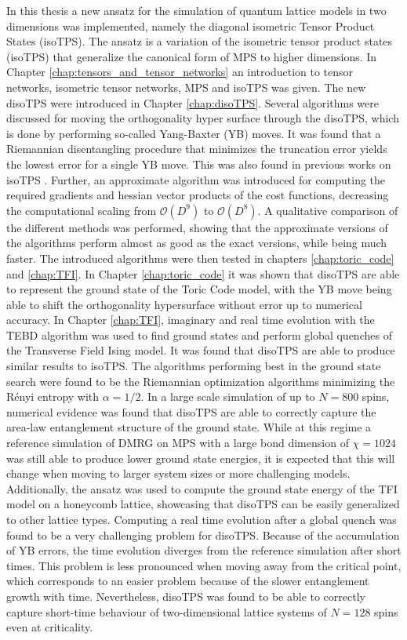 In this thesis a new ansatz for the simulation of quantum lattice models in two dimensions was implemented, namely the diagonal isometric Tensor Product States (isoTPS). The ansatz is a variation of the isometric tensor product states (isoTPS) that generalize the canonical form of MPS to higher dimensions. In Chapter \ref{chap:tensors_and_tensor_networks} an introduction to tensor networks, isometric tensor networks, MPS and isoTPS was given. The new disoTPS were introduced in Chapter \ref{chap:disoTPS}. Several algorithms were discussed for moving the orthogonality hyper	surface through the disoTPS, which is done by performing so-called Yang-Baxter (YB) moves. It was found that a Riemannian disentangling procedure that minimizes the truncation error yields the lowest error for a single YB move. This was also found in previous works on isoTPS \cite{cite:isometric_tensor_network_states_in_two_dimensions, cite:efficient_simulation_of_dynamics_in_two_dimensional_quantum_spin_systems}. Further, an approximate algorithm was introduced for computing the required gradients and hessian vector products of the cost functions, decreasing the computational scaling from $\mathcal{O}(D^9)$ to $\mathcal{O}(D^8)$. A qualitative comparison of the different methods was performed, showing that the approximate versions of the algorithms perform almost as good as the exact versions, while being much faster. The introduced algorithms were then tested in chapters \ref{chap:toric_code} and \ref{chap:TFI}. In Chapter \ref{chap:toric_code} it was shown that disoTPS are able to represent the ground state of the Toric Code model, with the YB move being able to shift the orthogonality hypersurface without error up to numerical accuracy. In Chapter \ref{chap:TFI}, imaginary and real time evolution with the TEBD algorithm was used to find ground states and perform global quenches of the Transverse Field Ising model. It was found that disoTPS are able to produce similar results to isoTPS. The algorithms performing best in the ground state search were found to be the Riemannian optimization algorithms minimizing the Rényi entropy with $\alpha = 1/2$. In a large scale simulation of up to $N = 800$ spins, numerical evidence was found that disoTPS are able to correctly capture the area-law entanglement structure of the ground state. While at this regime a reference simulation of DMRG on MPS with a large bond dimension of $\chi = 1024$ was still able to produce lower ground state energies, it is expected that this will change when moving to larger system sizes or more challenging models. Additionally, the ansatz was used to compute the ground state energy of the TFI model on a honeycomb lattice, showcasing that disoTPS can be easily generalized to other lattice types. Computing a real time evolution after a global quench was found to be a very challenging problem for disoTPS. Because of the accumulation of YB errors, the time evolution diverges from the reference simulation after short times. This problem is less pronounced when moving away from the critical point, which corresponds to an easier problem because of the slower entanglement growth with time. Nevertheless, disoTPS was found to be able to correctly capture short-time behaviour of two-dimensional lattice systems of $N = 128$ spins even at criticality. \par
